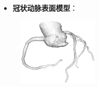 \begin{frame}
\begin{itemize}
  \item \textbf{冠状动脉表面模型}：
\end{itemize}
\begin{figure}[t]
\centering
\includegraphics[width=1.5in]{../../Figures/coronary/model}
\end{figure}
\end{frame} 

\begin{frame}

\end{frame} 
